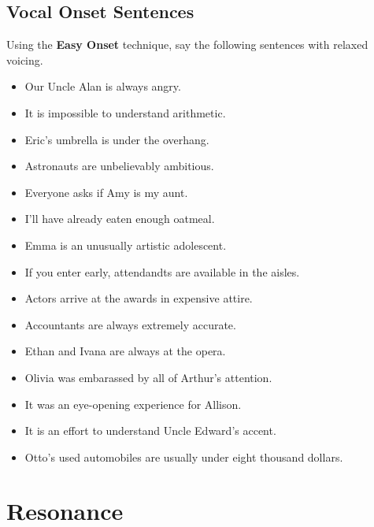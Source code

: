 \documentclass[12pt]{article}
\begin{document}
\subsection*{Vocal Onset Sentences}
Using the \textbf{Easy Onset} technique, say the following sentences with relaxed voicing.
\begin{itemize}
\item Our Uncle Alan is always angry.
\item It is impossible to understand arithmetic.
\item Eric's umbrella is under the overhang.
\item Astronauts are unbelievably ambitious.
\item Everyone asks if Amy is my aunt.
\item I'll have already eaten enough oatmeal.
\item Emma is an unusually artistic adolescent.
\item If you enter early, attendandts are available in the aisles.
\item Actors arrive at the awards in expensive attire.
\item Accountants are always extremely accurate.
\item Ethan and Ivana are always at the opera.
\item Olivia was embarassed by all of Arthur's attention.
\item It was an eye-opening experience for Allison.
\item It is an effort to understand Uncle Edward's accent.
\item Otto's used automobiles are usually under eight thousand dollars.
\end{itemize}

\pagebreak
\section*{Resonance}
\end{document}
